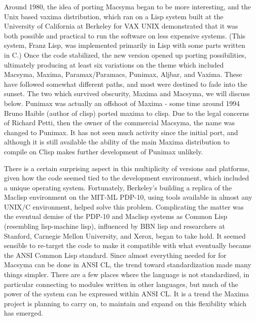 Around 1980, the idea of porting Macsyma began to be more interesting,
and the Unix based vaxima distribution, which ran on a Lisp system 
built at the University of California at Berkeley for VAX UNIX demonstrated 
that it was both possible and practical to run the software on less expensive 
systems.  (This system, Franz Lisp, was implemented primarily in Lisp with 
some parts written in C.) Once the code stabilized, the new version opened up 
porting possibilities, ultimately producing at least six variations on the 
theme which included Macsyma, Maxima, Paramax/Paramacs, Punimax, Aljbar, and 
Vaxima.  These have followed somewhat different paths, and most were destined 
to fade into the sunset.  The two which survived obscurity, Maxima and 
Macsyma, we will discuss below.  Punimax was actually an offshoot of Maxima - 
some time around 1994 Bruno Haible (author of clisp) ported maxima to clisp.
Due to the legal concerns of Richard Petti, then the owner of the commercial
Macsyma, the name was changed to Punimax.  It has not seen much activity since
the initial port, and although it is still available the ability of the main
Maxima distribution to compile on Clisp makes further development of 
Punimax unlikely.

 There is a certain surprising aspect in this multiplicity of versions
and platforms, given how the code seemed tied to the development environment,
which included a unique operating system.  Fortunately, Berkeley's building 
a replica of the Maclisp environment on the MIT-ML PDP-10, using tools 
available in almost any UNIX/C environment, helped solve this problem.
Complicating the matter was the eventual demise of the PDP-10 and 
Maclisp systems as Common Lisp (resembling lisp-machine lisp), influenced by 
BBN lisp and researchers at Stanford, Carnegie Mellon University, and Xerox, began to take 
hold.  It seemed sensible to re-target
the code to make it compatible with what eventually
became the ANSI Common Lisp standard.  Since almost everything needed for
for Macsyma can be done in ANSI CL, the trend toward standardization 
made many things simpler.  There are a few places
where the language is not standardized, in particular connecting to
modules written in other languages, but much of the power of the
system can be expressed within ANSI CL. It is a trend the Maxima
project is planning to carry on, to maintain and expand on this
flexibility which has emerged.

